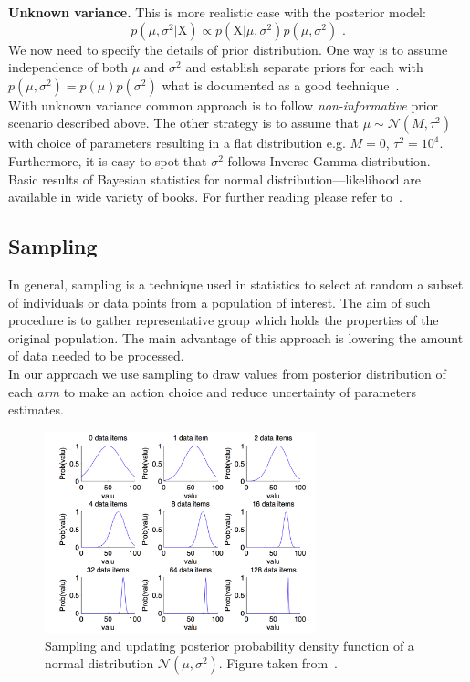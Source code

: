 \documentclass[12pt, a4paper, pdflatex, leqno]{report}
\begin{document}
\textbf{\textrm{Unknown variance. }}This is more realistic case with the posterior model:
$$
p \left(  \mu, \sigma^2 | \mathrm{X} \right) \propto p \left( \mathrm{X} | \mu, \sigma^2 \right)    p \left( \mu, \sigma^2 \right) \text{ .}
$$
We now need to specify the details of prior distribution. One way is to assume independence of both $\mu$ and $\sigma^2$ and establish separate priors for each with $p(\mu, \sigma^2) = p(\mu) p(\sigma^2)$ what is documented as a good technique~\citep{gelman2003bayesian}.\\
With unknown variance common approach is to follow \emph{non-informative} prior scenario described above. The other strategy is to assume that $\mu \sim \mathcal{N} \left( M, \tau^2 \right)$ with choice of parameters resulting in a flat distribution e.g. $M=0$, $\tau^2 = 10^4$. Furthermore, it is easy to spot that $\sigma^2$ follows \textrm{Inverse}-\textrm{Gamma} distribution.\\

Basic results of Bayesian statistics for normal distribution---likelihood are available in wide variety of books. For further reading please refer to~\citep{lynch2007introduction}\citep{gelman2003bayesian}.\\

\subsection{Sampling}
In general, sampling is a technique used in statistics to select at random a subset of individuals or data points from a population of interest. The aim of such procedure is to gather representative group which holds the properties of the original population. The main advantage of this approach is lowering the amount of data needed to be processed.\\
In our approach we use sampling to draw values from posterior distribution of each \emph{arm} to make an action choice and reduce uncertainty of parameters estimates.\\


\begin{figure}[htbp]
\centering
\includegraphics[width=0.7\textwidth]{graphics/sampling.png}
\begin{tiny}
\caption{Sampling and updating posterior probability density function of a normal distribution $\mathcal{N}\left( \mu , \sigma^2 \right)$. Figure taken from~\citep{Jacobs2008normalnormal}.\label{fig:sampling}}
\end{tiny}
\vspace{1cm}
\end{figure}
\end{document}
